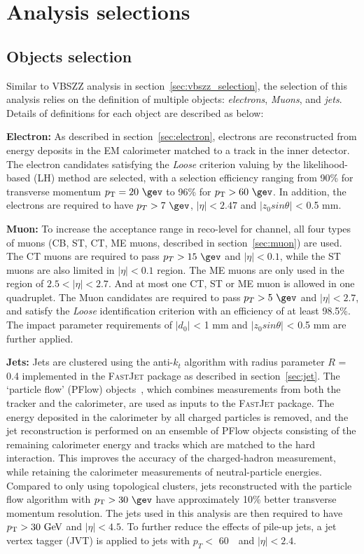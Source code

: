 \section{Analysis selections}
\label{sec:hmhzz_selection}

\subsection{Objects selection}
\label{sec:hmhzz_objsel}

Similar to VBSZZ analysis in section~\ref{sec:vbszz_selection}, the selection of this analysis relies on the definition of multiple objects: \textit{electrons}, \textit{Muons}, and \textit{jets}.
Details of definitions for each object are described as below:

\textbf{Electron:}
As described in section~\ref{sec:electron}, electrons are reconstructed from energy deposits in the EM calorimeter matched to a track in the inner detector.
The electron candidates satisfying the \textit{Loose} criterion valuing by the likelihood-based (LH) method are selected,
with a selection efficiency ranging from 90\% for transverse momentum $\pt = 20~\gev$ to 96\% for $\pt > 60~\gev$.
In addition, the electrons are required to have $p_{T} > 7~\gev$, $|\eta| < 2.47$ and $|z_{0} sin\theta|$ < 0.5 mm.

\textbf{Muon:}
To increase the acceptance range in reco-level for \llll channel, all four types of muons
(CB, ST, CT, ME muons, described in section~\ref{sec:muon}) are used.
The CT muons are required to pass $p_{T} > 15~\gev$ and $|\eta| < 0.1$, while the ST muons are also limited in $|\eta| < 0.1$ region.
The ME muons are only used in the region of $2.5 < |\eta| < 2.7$.
And at most one CT, ST or ME muon is allowed in one \llll quadruplet.
The Muon candidates are required to pass $p_{T} > 5~\gev$ and $|\eta| < 2.7$,
and satisfy the \textit{Loose} identification criterion with an efficiency of at least 98.5\%.
The impact parameter requirements of $|d_{0}|$ < 1 mm and $|z_{0} sin\theta|$ < 0.5 mm are further applied.

\textbf{Jets:}
Jets are clustered using the anti-$k_t$ algorithm with radius parameter $R$ = 0.4 implemented in the \textsc{FastJet} package as described in section~\ref{sec:jet}. 
The `particle flow' (PFlow) objects~\cite{PERF-2015-09}, which combines measurements from both the tracker and the calorimeter, are used as inputs to the \textsc{FastJet} package.
The energy deposited in the calorimeter by all charged particles is removed, and the jet reconstruction is performed on an ensemble of PFlow objects
consisting of the remaining calorimeter energy and tracks which are matched to the hard interaction.
This improves the accuracy of the charged-hadron measurement, while retaining the calorimeter measurements of neutral-particle energies. 
Compared to only using topological clusters, jets reconstructed with the particle flow algorithm with $\pt > 30~\gev$ have approximately 10\% better transverse momentum resolution.
The jets used in this analysis are then required to have $p_{\text{T}} > 30~\text{Ge\kern -0.1em V}$ and $|\eta | < 4.5$.
To further reduce the effects of pile-up jets, a jet vertex tagger (JVT) is applied to jets with $p_{T} <$ 60~\gev~and $|\eta| < 2.4$.

